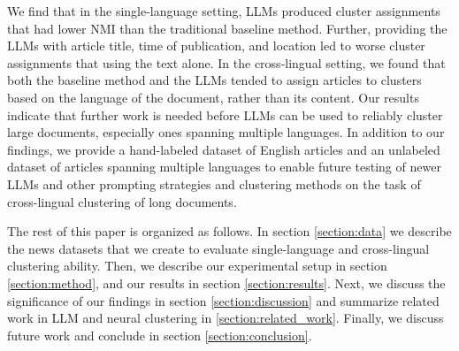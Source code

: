 We find that in the single-language setting, LLMs produced cluster assignments that had lower \ac{NMI} than the traditional baseline method.
Further, providing the LLMs with article title, time of publication, and location led to worse cluster assignments that using the text alone.
In the cross-lingual setting, we found that both the baseline method and the LLMs tended to assign articles to clusters based on the language of the document, rather than its content.
Our results indicate that further work is needed before LLMs can be used to reliably cluster large documents, especially ones spanning multiple languages.
In addition to our findings, we provide a hand-labeled dataset of English articles and an unlabeled dataset of articles spanning multiple languages to enable future testing of newer LLMs and other prompting strategies and clustering methods on the task of cross-lingual clustering of long documents.

The rest of this paper is organized as follows.
In section \ref{section:data} we describe the news datasets that we create to evaluate single-language and cross-lingual clustering ability.
Then, we describe our experimental setup in section \ref{section:method}, and our results in section \ref{section:results}.
Next, we discuss the significance of our findings in section \ref{section:discussion} and summarize related work in LLM and neural clustering in \ref{section:related_work}.
Finally, we discuss future work and conclude in section \ref{section:conclusion}.